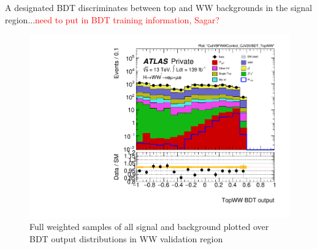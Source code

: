 A designated BDT discriminates between top and WW backgrounds in the signal region...\textcolor{red}{need to put in BDT training information, Sagar?}

\begin{figure}[!htbp]
\centering
\includegraphics[width=.6\linewidth]{Pictures/run2-emme-CutVBFWWControl_CJV20-BDT_TopWW-log.pdf}
\caption{Full weighted samples of all signal and background plotted over BDT output distributions in WW validation region}
\label{fig:TopWWBDTVR}
\end{figure}

